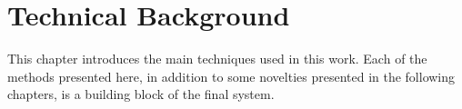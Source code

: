\chapter{Technical Background}
\label{ch:background}
This chapter introduces the main techniques used in this work. Each of the methods presented here, in addition to some novelties presented in the following chapters, is a building block of the final system.






